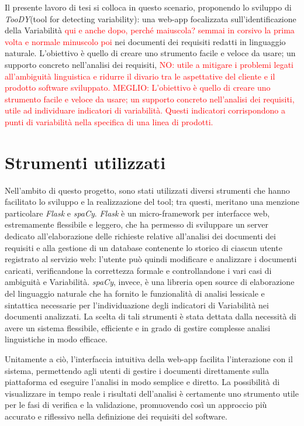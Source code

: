 \documentclass[12pt]{report}
\newcommand{\torevise}[1]{\textcolor{red}{#1}}
\newcommand{\toody}{\textsl{TooDY}\xspace}
\newcommand{\flask}{\textsl{Flask}\xspace}
\newcommand{\spacy}{\textsl{spaCy}\xspace}
\begin{document}
Il presente lavoro di tesi si colloca in questo scenario, proponendo lo sviluppo di \toody (tool for detecting variability): una web-app focalizzata sull’identificazione della Variabilità \torevise{qui e anche dopo, perché maiuscola? semmai in corsivo la prima volta e normale minuscolo poi} nei documenti dei requisiti redatti in linguaggio naturale. L’obiettivo è quello di creare uno strumento facile e veloce da usare; un supporto concreto nell’analisi dei requisiti, \torevise{NO: utile a mitigare i problemi legati all’ambiguità linguistica e ridurre il divario tra le aspettative del cliente e il prodotto software sviluppato.} \torevise{MEGLIO: L’obiettivo è quello di creare uno strumento facile e veloce da usare; un supporto concreto nell’analisi dei requisiti, utile ad individuare indicatori di variabilità. Questi indicatori corrispondono a punti di variabilità nella specifica di una linea di prodotti. }


\section{Strumenti utilizzati}
Nell’ambito di questo progetto, sono stati utilizzati diversi strumenti che hanno facilitato lo sviluppo e la realizzazione del tool; tra questi, meritano una menzione particolare \flask e \spacy. \flask è un micro-framework per interfacce web, estremamente flessibile e leggero, che ha permesso di sviluppare un server dedicato all’elaborazione delle richieste relative all’analisi dei documenti dei requisiti e alla gestione di un database contenente lo storico di ciascun utente registrato al servizio web: l'utente può quindi modificare e analizzare i documenti caricati, verificandone la correttezza formale e controllandone i vari casi di ambiguità e Variabilità. \spacy, invece, è una libreria open source di elaborazione del linguaggio naturale che ha fornito le funzionalità di analisi lessicale e sintattica necessarie per l’individuazione degli indicatori di Variabilità nei documenti analizzati. La scelta di tali strumenti è stata dettata dalla necessità di avere un sistema flessibile, efficiente e in grado di gestire complesse analisi linguistiche in modo efficace.

Unitamente a ciò, l'interfaccia intuitiva della web-app facilita l'interazione con il sistema, permettendo agli utenti di gestire i documenti direttamente sulla piattaforma ed eseguire l'analisi in modo semplice e diretto. La possibilità di visualizzare in tempo reale i risultati dell'analisi è certamente uno strumento utile per le fasi di verifica e la validazione, promuovendo così un approccio più accurato e riflessivo nella definizione dei requisiti del software.
\end{document}
